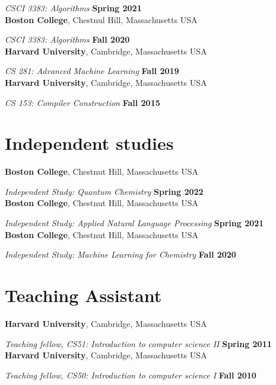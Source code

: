 \documentclass[margin,line]{res}
\begin{document}
\begin{resume}
{\em CSCI 3383: Algorithms} \hfill {\bf Spring 2021}\\
{\bf Boston College}, Chestnul Hill, Massachusetts USA
\vspace{-.4cm}

{\em CSCI 3383: Algorithms} \hfill {\bf Fall 2020}\\
{\bf Harvard University}, Cambridge, Massachusetts USA
\vspace{-.4cm}

{\em CS 281: Advanced Machine Learning} \hfill {\bf Fall 2019}\\
{\bf Harvard University}, Cambridge, Massachusetts USA
\vspace{-.4cm}

{\em CS 153: Compiler Construction} \hfill {\bf Fall 2015}\\


\section{\sc Independent studies}

{\bf Boston College}, Chestnut Hill, Massachusetts USA
\vspace{-.4cm}

{\em Independent Study: Quantum Chemistry} \hfill {\bf Spring 2022}\\
{\bf Boston College}, Chestnut Hill, Massachusetts USA
\vspace{-.4cm}

{\em Independent Study: Applied Natural Language Processing} \hfill {\bf Spring 2021}\\
{\bf Boston College}, Chestnut Hill, Massachusetts USA
\vspace{-.4cm}

{\em Independent Study: Machine Learning for Chemistry} \hfill {\bf Fall 2020}\\

\section{\sc Teaching Assistant}

{\bf Harvard University}, Cambridge, Massachusetts USA
\vspace{-.4cm}

{\em Teaching fellow, CS51: Introduction to computer science II} \hfill {\bf Spring 2011}\\
{\bf Harvard University}, Cambridge, Massachusetts USA

\vspace{-.4cm}
{\em Teaching fellow, CS50: Introduction to computer science I} \hfill {\bf Fall 2010}\\



\end{resume}
\end{document}
